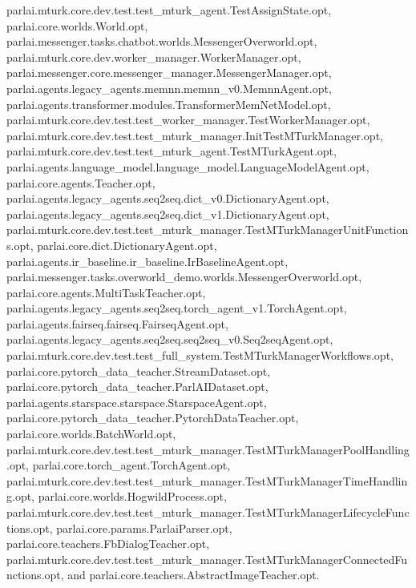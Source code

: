 parlai.\+mturk.\+core.\+dev.\+test.\+test\+\_\+mturk\+\_\+agent.\+Test\+Assign\+State.\+opt, parlai.\+core.\+worlds.\+World.\+opt, parlai.\+messenger.\+tasks.\+chatbot.\+worlds.\+Messenger\+Overworld.\+opt, parlai.\+mturk.\+core.\+dev.\+worker\+\_\+manager.\+Worker\+Manager.\+opt, parlai.\+messenger.\+core.\+messenger\+\_\+manager.\+Messenger\+Manager.\+opt, parlai.\+agents.\+legacy\+\_\+agents.\+memnn.\+memnn\+\_\+v0.\+Memnn\+Agent.\+opt, parlai.\+agents.\+transformer.\+modules.\+Transformer\+Mem\+Net\+Model.\+opt, parlai.\+mturk.\+core.\+dev.\+test.\+test\+\_\+worker\+\_\+manager.\+Test\+Worker\+Manager.\+opt, parlai.\+mturk.\+core.\+dev.\+test.\+test\+\_\+mturk\+\_\+manager.\+Init\+Test\+M\+Turk\+Manager.\+opt, parlai.\+mturk.\+core.\+dev.\+test.\+test\+\_\+mturk\+\_\+agent.\+Test\+M\+Turk\+Agent.\+opt, parlai.\+agents.\+language\+\_\+model.\+language\+\_\+model.\+Language\+Model\+Agent.\+opt, parlai.\+core.\+agents.\+Teacher.\+opt, parlai.\+agents.\+legacy\+\_\+agents.\+seq2seq.\+dict\+\_\+v0.\+Dictionary\+Agent.\+opt, parlai.\+agents.\+legacy\+\_\+agents.\+seq2seq.\+dict\+\_\+v1.\+Dictionary\+Agent.\+opt, parlai.\+mturk.\+core.\+dev.\+test.\+test\+\_\+mturk\+\_\+manager.\+Test\+M\+Turk\+Manager\+Unit\+Functions.\+opt, parlai.\+core.\+dict.\+Dictionary\+Agent.\+opt, parlai.\+agents.\+ir\+\_\+baseline.\+ir\+\_\+baseline.\+Ir\+Baseline\+Agent.\+opt, parlai.\+messenger.\+tasks.\+overworld\+\_\+demo.\+worlds.\+Messenger\+Overworld.\+opt, parlai.\+core.\+agents.\+Multi\+Task\+Teacher.\+opt, parlai.\+agents.\+legacy\+\_\+agents.\+seq2seq.\+torch\+\_\+agent\+\_\+v1.\+Torch\+Agent.\+opt, parlai.\+agents.\+fairseq.\+fairseq.\+Fairseq\+Agent.\+opt, parlai.\+agents.\+legacy\+\_\+agents.\+seq2seq.\+seq2seq\+\_\+v0.\+Seq2seq\+Agent.\+opt, parlai.\+mturk.\+core.\+dev.\+test.\+test\+\_\+full\+\_\+system.\+Test\+M\+Turk\+Manager\+Workflows.\+opt, parlai.\+core.\+pytorch\+\_\+data\+\_\+teacher.\+Stream\+Dataset.\+opt, parlai.\+core.\+pytorch\+\_\+data\+\_\+teacher.\+Parl\+A\+I\+Dataset.\+opt, parlai.\+agents.\+starspace.\+starspace.\+Starspace\+Agent.\+opt, parlai.\+core.\+pytorch\+\_\+data\+\_\+teacher.\+Pytorch\+Data\+Teacher.\+opt, parlai.\+core.\+worlds.\+Batch\+World.\+opt, parlai.\+mturk.\+core.\+dev.\+test.\+test\+\_\+mturk\+\_\+manager.\+Test\+M\+Turk\+Manager\+Pool\+Handling.\+opt, parlai.\+core.\+torch\+\_\+agent.\+Torch\+Agent.\+opt, parlai.\+mturk.\+core.\+dev.\+test.\+test\+\_\+mturk\+\_\+manager.\+Test\+M\+Turk\+Manager\+Time\+Handling.\+opt, parlai.\+core.\+worlds.\+Hogwild\+Process.\+opt, parlai.\+mturk.\+core.\+dev.\+test.\+test\+\_\+mturk\+\_\+manager.\+Test\+M\+Turk\+Manager\+Lifecycle\+Functions.\+opt, parlai.\+core.\+params.\+Parlai\+Parser.\+opt, parlai.\+core.\+teachers.\+Fb\+Dialog\+Teacher.\+opt, parlai.\+mturk.\+core.\+dev.\+test.\+test\+\_\+mturk\+\_\+manager.\+Test\+M\+Turk\+Manager\+Connected\+Functions.\+opt, and parlai.\+core.\+teachers.\+Abstract\+Image\+Teacher.\+opt.



